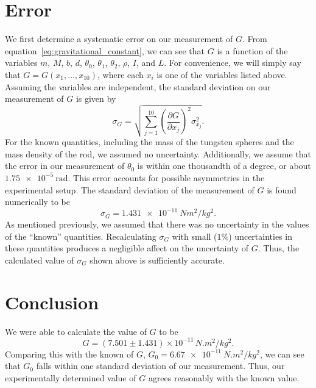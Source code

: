 \documentclass[aps, reprint,amsmath,amssymb]{revtex4-1} %
\renewcommand{\d}{\partial}
\begin{document}
\section{Error}
We first determine a systematic error on our measurement of $G$. From
equation~\eqref{eq:gravitational_constant}, we can see that $G$ is a
function of the variables $m$, $M$, $b$, $d$, $\theta_0$, $\theta_1$,
$\theta_2$, $\rho$, $I$, and $L$. For convenience, we will simply say that
$G = G(x_1,\ldots,x_{10})$, where each $x_i$ is one of the variables listed
above. Assuming the variables are independent, the standard deviation on our
measurement of $G$ is given by
\[
    \sigma_G = \sqrt{\sum_{j=1}^{10} \left( \frac{\d G}{\d x_j} \right)^2
    \sigma_{x_j}^2}.
\]
For the known quantities, including the mass of the tungsten spheres and
the mass density of the rod, we assumed no uncertainty. Additionally, we
assume that the error in our measurement of $\theta_0$ is within one
thousandth of a degree, or about $\SI{1.75e-5}{\radian}$. This error
accounts for possible asymmetries in the experimental setup. The standard
deviation of the measurement of $G$ is found numerically to be
\[
    \sigma_G = \SI{1.431e-11}{Nm^2/kg^2}.
\]
As mentioned previously, we assumed that there was no uncertainty in the
values of the ``known'' quantities. Recalculating $\sigma_G$ with small
($1\%$) uncertainties in these quantities produces a negligible affect on
the uncertainty of $G$. Thus, the calculated value of $\sigma_G$ shown
above is sufficiently accurate.

\section{Conclusion}

We were able to calculate the value of $G$ to be
\[
    G = (7.501 \pm 1.431)\times 10^{-11} \,\si{N.m^2/kg^2}.
\]
Comparing this with the known of $G$, $G_0 = \SI{6.67e-11}{N.m^2/kg^2}$, we can
see that $G_0$ falls within one standard deviation of our measurement.
Thus, our experimentally determined value of $G$ agrees reasonably with the
known value. 
\end{document}
